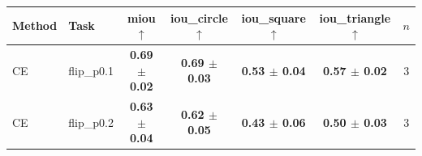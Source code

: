 \begin{tabular}{llccccc}
\toprule
Method & Task & miou $\uparrow$ & iou\_circle $\uparrow$ & iou\_square $\uparrow$ & iou\_triangle $\uparrow$ & $n$ \\
\midrule
CE & flip\_p0.1 & \textbf{0.69 $\pm$ 0.02} & \textbf{0.69 $\pm$ 0.03} & \textbf{0.53 $\pm$ 0.04} & \textbf{0.57 $\pm$ 0.02} & 3 \\
\midrule
CE & flip\_p0.2 & \textbf{0.63 $\pm$ 0.04} & \textbf{0.62 $\pm$ 0.05} & \textbf{0.43 $\pm$ 0.06} & \textbf{0.50 $\pm$ 0.03} & 3 \\
\bottomrule
\end{tabular}
